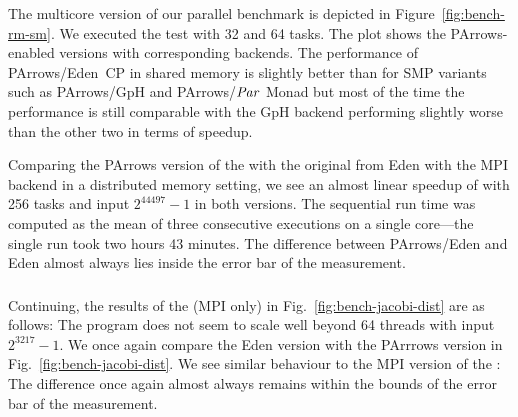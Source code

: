 The multicore version of our parallel \rmtest benchmark is depicted in
Figure~\ref{fig:bench-rm-sm}. We executed the test with 32 and 64
tasks. The plot shows the PArrows-enabled versions with corresponding backends.
The performance of PArrows/Eden~CP in shared memory is slightly better than
for SMP variants such as PArrows/GpH and PArrows/\ensuremath{\Conid{Par}}
Monad but most of the time the performance is still comparable with the GpH backend performing slightly worse than the other two in terms of speedup.

Comparing the PArrows version of the \rmtest with the original from Eden with the MPI backend in a distributed memory setting, we see an almost linear speedup of
\rmtest with 256 tasks and input $2^{44497}-1$ in both versions. The sequential run time
was computed as the mean of three consecutive executions on a single
core---the single run took two hours 43 minutes. The difference between
PArrows/Eden and Eden almost always lies inside the error bar of
the measurement.


\subsubsection{\jacobitest}

Continuing, the results of the \jacobitest (MPI only) in Fig.~\ref{fig:bench-jacobi-dist} are as follows:
The program does not seem to scale well beyond 64 threads with input $2^{3217}-1$. We once again compare the Eden version with the PArrrows version in Fig.~\ref{fig:bench-jacobi-dist}. We see similar behaviour to the MPI version of the \rmtest: The difference once again almost always remains within the bounds of the error bar of the measurement.

